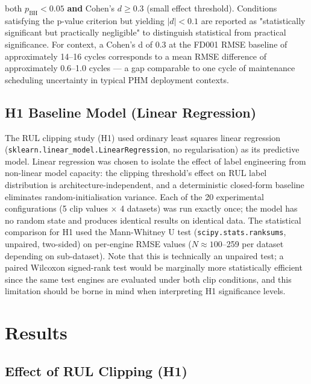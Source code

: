 \documentclass[preprint,10pt]{elsarticle}
\begin{document}
both $p_{\text{BH}} < 0.05$ \textbf{and} Cohen's $d \geq 0.3$ (small effect threshold). Conditions satisfying the p-value criterion but yielding $|d| < 0.1$ are reported as "statistically significant but practically negligible" to distinguish statistical from practical significance. For context, a Cohen's d of 0.3 at the FD001 RMSE baseline of approximately 14–16 cycles corresponds to a mean RMSE difference of approximately 0.6–1.0 cycles — a gap comparable to one cycle of maintenance scheduling uncertainty in typical PHM deployment contexts.

\subsection{H1 Baseline Model (Linear Regression)}

\begin{sloppypar}
The RUL clipping study (H1) used ordinary least squares linear regression (\texttt{sklearn.linear\_model.LinearRegression}, no regularisation) as its predictive model. Linear regression was chosen to isolate the effect of label engineering from non-linear model capacity: the clipping threshold's effect on RUL label distribution is architecture-independent, and a deterministic closed-form baseline eliminates random-initialisation variance. Each of the 20 experimental configurations (5 clip values × 4 datasets) was run exactly once; the model has no random state and produces identical results on identical data. The statistical comparison for H1 used the Mann-Whitney U test (\texttt{scipy.stats.ranksums}, unpaired, two-sided) on per-engine RMSE values ($N \approx 100$--259 per dataset depending on sub-dataset). Note that this is technically an unpaired test; a paired Wilcoxon signed-rank test would be marginally more statistically efficient since the same test engines are evaluated under both clip conditions, and this limitation should be borne in mind when interpreting H1 significance levels.
\end{sloppypar}

\section{Results}

\subsection{Effect of RUL Clipping (H1)}
\end{document}
